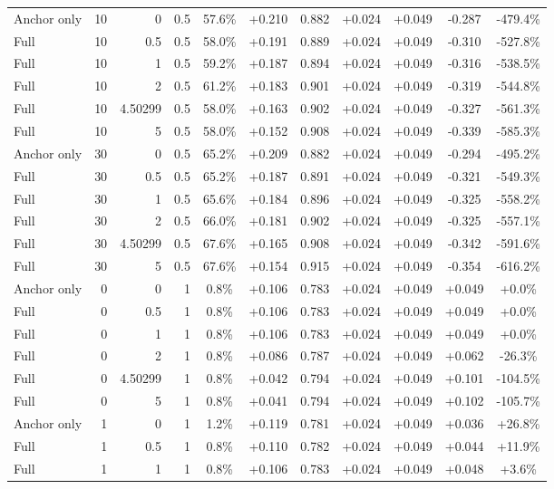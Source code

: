 \begin{table}[htbp]
\begin{tabular}{lrrrccccccc}
Anchor only & 10 & 0 & 0.5 & 57.6\% & +0.210 & 0.882 & +0.024 & +0.049 & -0.287 & -479.4\% \\
Full & 10 & 0.5 & 0.5 & 58.0\% & +0.191 & 0.889 & +0.024 & +0.049 & -0.310 & -527.8\% \\
Full & 10 & 1 & 0.5 & 59.2\% & +0.187 & 0.894 & +0.024 & +0.049 & -0.316 & -538.5\% \\
Full & 10 & 2 & 0.5 & 61.2\% & +0.183 & 0.901 & +0.024 & +0.049 & -0.319 & -544.8\% \\
Full & 10 & 4.50299 & 0.5 & 58.0\% & +0.163 & 0.902 & +0.024 & +0.049 & -0.327 & -561.3\% \\
Full & 10 & 5 & 0.5 & 58.0\% & +0.152 & 0.908 & +0.024 & +0.049 & -0.339 & -585.3\% \\
Anchor only & 30 & 0 & 0.5 & 65.2\% & +0.209 & 0.882 & +0.024 & +0.049 & -0.294 & -495.2\% \\
Full & 30 & 0.5 & 0.5 & 65.2\% & +0.187 & 0.891 & +0.024 & +0.049 & -0.321 & -549.3\% \\
Full & 30 & 1 & 0.5 & 65.6\% & +0.184 & 0.896 & +0.024 & +0.049 & -0.325 & -558.2\% \\
Full & 30 & 2 & 0.5 & 66.0\% & +0.181 & 0.902 & +0.024 & +0.049 & -0.325 & -557.1\% \\
Full & 30 & 4.50299 & 0.5 & 67.6\% & +0.165 & 0.908 & +0.024 & +0.049 & -0.342 & -591.6\% \\
Full & 30 & 5 & 0.5 & 67.6\% & +0.154 & 0.915 & +0.024 & +0.049 & -0.354 & -616.2\% \\
Anchor only & 0 & 0 & 1 & 0.8\% & +0.106 & 0.783 & +0.024 & +0.049 & +0.049 & +0.0\% \\
Full & 0 & 0.5 & 1 & 0.8\% & +0.106 & 0.783 & +0.024 & +0.049 & +0.049 & +0.0\% \\
Full & 0 & 1 & 1 & 0.8\% & +0.106 & 0.783 & +0.024 & +0.049 & +0.049 & +0.0\% \\
Full & 0 & 2 & 1 & 0.8\% & +0.086 & 0.787 & +0.024 & +0.049 & +0.062 & -26.3\% \\
Full & 0 & 4.50299 & 1 & 0.8\% & +0.042 & 0.794 & +0.024 & +0.049 & +0.101 & -104.5\% \\
Full & 0 & 5 & 1 & 0.8\% & +0.041 & 0.794 & +0.024 & +0.049 & +0.102 & -105.7\% \\
Anchor only & 1 & 0 & 1 & 1.2\% & +0.119 & 0.781 & +0.024 & +0.049 & +0.036 & +26.8\% \\
Full & 1 & 0.5 & 1 & 0.8\% & +0.110 & 0.782 & +0.024 & +0.049 & +0.044 & +11.9\% \\
Full & 1 & 1 & 1 & 0.8\% & +0.106 & 0.783 & +0.024 & +0.049 & +0.048 & +3.6\% \\

\end{tabular}
\end{table}
